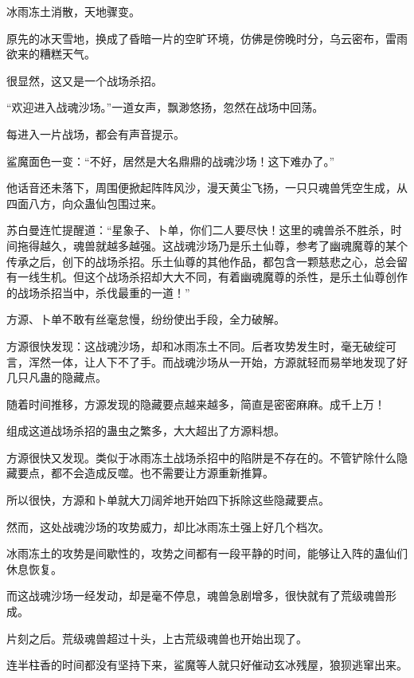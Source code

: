 
\begin{this_body}

冰雨冻土消散，天地骤变。

原先的冰天雪地，换成了昏暗一片的空旷环境，仿佛是傍晚时分，乌云密布，雷雨欲来的糟糕天气。

很显然，这又是一个战场杀招。

“欢迎进入战魂沙场。”一道女声，飘渺悠扬，忽然在战场中回荡。

每进入一片战场，都会有声音提示。

鲨魔面色一变：“不好，居然是大名鼎鼎的战魂沙场！这下难办了。”

他话音还未落下，周围便掀起阵阵风沙，漫天黄尘飞扬，一只只魂兽凭空生成，从四面八方，向众蛊仙包围过来。

苏白曼连忙提醒道：“星象子、卜单，你们二人要尽快！这里的魂兽杀不胜杀，时间拖得越久，魂兽就越多越强。这战魂沙场乃是乐土仙尊，参考了幽魂魔尊的某个传承之后，创下的战场杀招。乐土仙尊的其他作品，都包含一颗慈悲之心，总会留有一线生机。但这个战场杀招却大大不同，有着幽魂魔尊的杀性，是乐土仙尊创作的战场杀招当中，杀伐最重的一道！”

方源、卜单不敢有丝毫怠慢，纷纷使出手段，全力破解。

方源很快发现：这战魂沙场，却和冰雨冻土不同。后者攻势发生时，毫无破绽可言，浑然一体，让人下不了手。而战魂沙场从一开始，方源就轻而易举地发现了好几只凡蛊的隐藏点。

随着时间推移，方源发现的隐藏要点越来越多，简直是密密麻麻。成千上万！

组成这道战场杀招的蛊虫之繁多，大大超出了方源料想。

方源很快又发现。类似于冰雨冻土战场杀招中的陷阱是不存在的。不管铲除什么隐藏要点，都不会造成反噬。也不需要让方源重新推算。

所以很快，方源和卜单就大刀阔斧地开始四下拆除这些隐藏要点。

然而，这处战魂沙场的攻势威力，却比冰雨冻土强上好几个档次。

冰雨冻土的攻势是间歇性的，攻势之间都有一段平静的时间，能够让入阵的蛊仙们休息恢复。

而这战魂沙场一经发动，却是毫不停息，魂兽急剧增多，很快就有了荒级魂兽形成。

片刻之后。荒级魂兽超过十头，上古荒级魂兽也开始出现了。

连半柱香的时间都没有坚持下来，鲨魔等人就只好催动玄冰残屋，狼狈逃窜出来。


\end{this_body}

